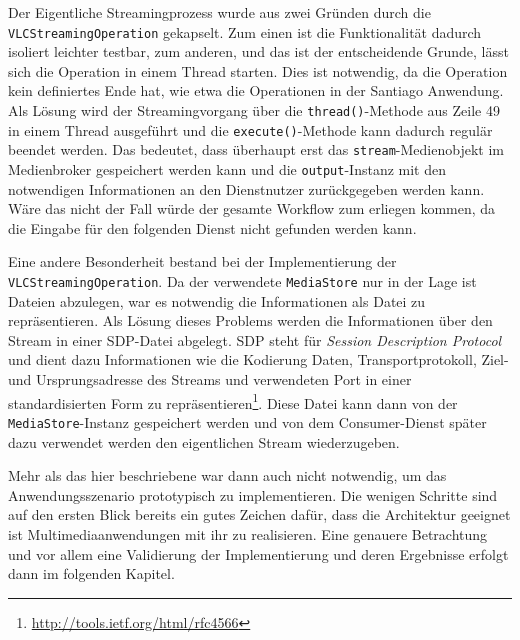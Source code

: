   Der Eigentliche Streamingprozess wurde aus zwei Gründen durch die \verb!VLCStreamingOperation! gekapselt. Zum einen ist die Funktionalität dadurch isoliert leichter testbar, zum anderen, und das ist der entscheidende Grunde, lässt sich die Operation in einem Thread starten. Dies ist notwendig, da die Operation kein definiertes Ende hat, wie etwa die Operationen in der Santiago Anwendung. Als Lösung wird der Streamingvorgang über die \verb!thread()!-Methode aus Zeile 49 in einem Thread ausgeführt und die \verb!execute()!-Methode kann dadurch regulär beendet werden. Das bedeutet, dass überhaupt erst das \verb!stream!-Medienobjekt im Medienbroker gespeichert werden kann und die \verb!output!-Instanz mit den notwendigen Informationen an den Dienstnutzer zurückgegeben werden kann. Wäre das nicht der Fall würde der gesamte Workflow zum erliegen kommen, da die Eingabe für den folgenden Dienst nicht gefunden werden kann.
  
  Eine andere Besonderheit bestand bei der Implementierung der \verb!VLCStreamingOperation!. Da der verwendete \verb!MediaStore! nur in der Lage ist Dateien abzulegen, war es notwendig die Informationen als Datei zu repräsentieren. Als Lösung dieses Problems werden die Informationen über den Stream in einer SDP-Datei abgelegt. SDP steht für \emph{Session Description Protocol} und dient dazu Informationen wie die Kodierung Daten, Transportprotokoll, Ziel- und Ursprungsadresse des Streams und verwendeten Port in einer standardisierten Form zu repräsentieren\footnote{\url{http://tools.ietf.org/html/rfc4566}}. Diese Datei kann dann von der \verb!MediaStore!-Instanz gespeichert werden und von dem Consumer-Dienst später dazu verwendet werden den eigentlichen Stream wiederzugeben.

  Mehr als das hier beschriebene war dann auch nicht notwendig, um das Anwendungsszenario prototypisch zu implementieren. Die wenigen Schritte sind auf den ersten Blick bereits ein gutes Zeichen dafür, dass die Architektur geeignet ist Multimediaanwendungen mit ihr zu realisieren. Eine genauere Betrachtung und vor allem eine Validierung der Implementierung und deren Ergebnisse erfolgt dann im folgenden Kapitel.


